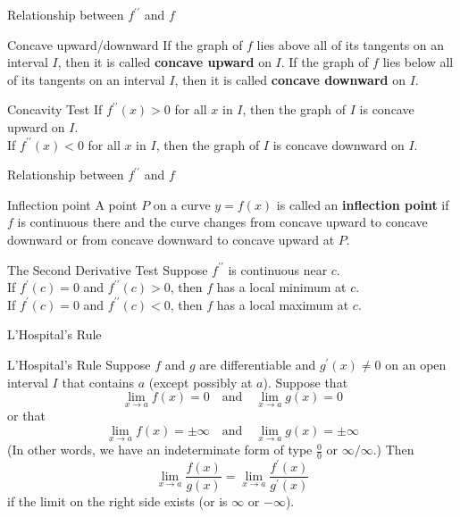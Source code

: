 \begin{frame}{Relationship between $f^{\prime\prime}$ and $f$}
    \begin{block}{Concave upward/downward}
        If the graph of $f$ lies above all of its tangents on an interval $I$, then it is called \textbf{concave upward} on $I$. If the graph of $f$ lies below all of its tangents on an interval $I$, then it is called \textbf{concave downward} on $I$.
    \end{block}
    \begin{block}{Concavity Test}
        If $f^{\prime\prime}(x)>0$ for all $x$ in $I$, then the graph of $I$ is concave upward on $I$.\\
        If $f^{\prime\prime}(x)<0$ for all $x$ in $I$, then the graph of $I$ is concave downward on $I$.
    \end{block}
\end{frame}



\begin{frame}{Relationship between $f^{\prime\prime}$ and $f$}
    \begin{block}{Inflection point}
        A point $P$ on a curve $y=f(x)$ is called an \textbf{inflection point} if $f$ is continuous there and the curve changes from concave upward to concave downward or from concave downward to concave upward at $P$.
    \end{block}
    \begin{block}{The Second Derivative Test}
        Suppose $f^{\prime\prime}$ is continuous near $c$.\\
        If $f^\prime(c)=0$ and $f^{\prime\prime}(c)>0$, then $f$ has a local minimum at $c$.\\
        If $f^\prime(c)=0$ and $f^{\prime\prime}(c)<0$, then $f$ has a local maximum at $c$.
    \end{block}
\end{frame}


\begin{frame}{L'Hospital's Rule}
    \begin{block}{L'Hospital's Rule}
        Suppose $f$ and $g$ are differentiable and $g^\prime(x)\neq0$ on an open interval $I$ that contains $a$ (except possibly at $a$). Suppose that\\
        $$
            \lim_{x\rightarrow a}f(x)=0\quad \text{and}\quad \lim_{x\rightarrow a}g(x)=0
        $$
        or that
        $$
            \lim_{x\rightarrow a}f(x)=\pm\infty\quad \text{and}\quad \lim_{x\rightarrow a}g(x)=\pm\infty
        $$
        (In other words, we have an indeterminate form of type $\frac{0}{0}$ or $\infty/\infty$.) Then\\
        $$
            \lim_{x\rightarrow a}\frac{f(x)}{g(x)}=\lim_{x\rightarrow a}\frac{f^\prime(x)}{g^\prime(x)}
        $$
        if the limit on the right side exists (or is $\infty$ or $-\infty$).
    \end{block}
\end{frame}






